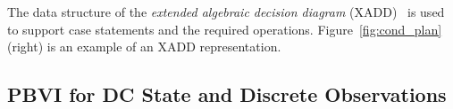 \documentclass{article} %
\begin{document}
The data structure of the \emph{extended algebraic decision diagram}
(XADD)~\cite{sanner_uai11} is used to support case statements and the
required operations.  Figure~\ref{fig:cond_plan} (right) 
is an example of an XADD representation.

\subsection{PBVI for DC State and Discrete Observations} 
\label{sec:disc_obs}
\end{document}
